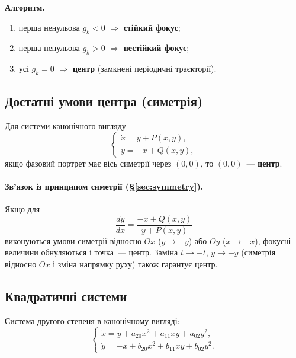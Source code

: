 \documentclass[12pt,a4paper]{article}
\begin{document}
\textbf{Алгоритм.}
\begin{enumerate}[leftmargin=1.8em]
  \item перша ненульова $g_k<0$ $\Rightarrow$ \textbf{стійкий фокус};
  \item перша ненульова $g_k>0$ $\Rightarrow$ \textbf{нестійкий фокус};
  \item усі $g_k=0$ $\Rightarrow$ \textbf{центр} (замкнені періодичні траєкторії).
\end{enumerate}

\subsection{Достатні умови центра (симетрія)}

Для системи канонічного вигляду
\begin{equation}\label{eq:canonical-center}
\begin{cases}
  \dot{x} = y + P(x,y),\\
  \dot{y} = -x + Q(x,y),
\end{cases}
\end{equation}
якщо фазовий портрет має вісь симетрії через $(0,0)$, то $(0,0)$~---
\textbf{центр}.

\paragraph{Зв'язок із принципом симетрії (§\ref{sec:symmetry}).}
Якщо для
\begin{equation*}
  \frac{dy}{dx}=\frac{-x+Q(x,y)}{y+P(x,y)}
\end{equation*}
виконуються умови симетрії відносно $Ox$ ($y\to-y$) або $Oy$ ($x\to-x$),
фокусні величини обнуляються і точка~--- центр. Заміна $t\to-t$, $y\to-y$
(симетрія відносно $Ox$ і зміна напрямку руху) також гарантує центр.

\subsection{Квадратичні системи}

Система другого степеня в канонічному вигляді:
\begin{equation}\label{eq:quadratic-canonical}
\begin{cases}
  \dot{x} = y + a_{20}x^2 + a_{11}xy + a_{02}y^2,\\
  \dot{y} = -x + b_{20}x^2 + b_{11}xy + b_{02}y^2.
\end{cases}
\end{equation}
\end{document}
